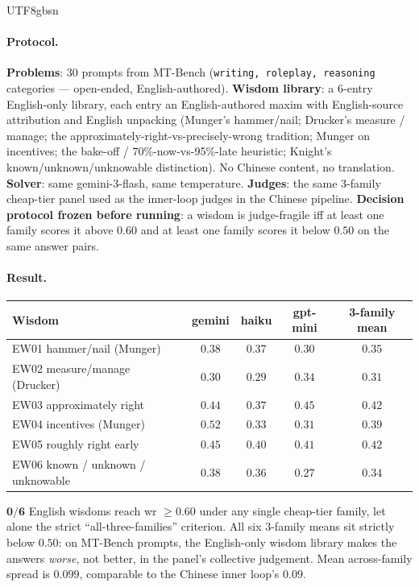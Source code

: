 \documentclass{article}
\begin{document}
\begin{CJK*}{UTF8}{gbsn}
\paragraph{Protocol.}
\textbf{Problems}: 30 prompts from MT-Bench (\texttt{writing,
roleplay, reasoning} categories — open-ended, English-authored).
\textbf{Wisdom library}: a 6-entry English-only library, each
entry an English-authored maxim with English-source attribution
and English unpacking (Munger's hammer/nail; Drucker's measure /
manage; the approximately-right-vs-precisely-wrong tradition;
Munger on incentives; the bake-off / 70\%-now-vs-95\%-late
heuristic; Knight's known/unknown/unknowable distinction). No
Chinese content, no translation. \textbf{Solver}: same
gemini-3-flash, same temperature. \textbf{Judges}: the same
3-family cheap-tier panel used as the inner-loop judges in the
Chinese pipeline. \textbf{Decision protocol frozen before
running}: a wisdom is judge-fragile iff at least one family
scores it above \(0.60\) and at least one family scores it below
\(0.50\) on the same answer pairs.

\paragraph{Result.}

\begin{center}\small
\begin{tabular}{l c c c c}
  \toprule
  Wisdom & gemini & haiku & gpt-mini & 3-family mean \\
  \midrule
  EW01 hammer/nail (Munger)         & \(0.38\) & \(0.37\) & \(0.30\) & \(0.35\) \\
  EW02 measure/manage (Drucker)     & \(0.30\) & \(0.29\) & \(0.34\) & \(0.31\) \\
  EW03 approximately right          & \(0.44\) & \(0.37\) & \(0.45\) & \(0.42\) \\
  EW04 incentives (Munger)          & \(0.52\) & \(0.33\) & \(0.31\) & \(0.39\) \\
  EW05 roughly right early          & \(0.45\) & \(0.40\) & \(0.41\) & \(0.42\) \\
  EW06 known / unknown / unknowable & \(0.38\) & \(0.36\) & \(0.27\) & \(0.34\) \\
  \bottomrule
\end{tabular}
\end{center}

\(\mathbf{0/6}\) English wisdoms reach wr \(\geq 0.60\) under any
single cheap-tier family, let alone the strict
``all-three-families'' criterion. All six 3-family means sit
strictly below \(0.50\): on MT-Bench prompts, the English-only
wisdom library makes the answers \emph{worse}, not better, in the
panel's collective judgement. Mean across-family spread is
\(\mathbf{0.099}\), comparable to the Chinese inner loop's
\(0.09\).


\end{CJK*}
\end{document}
